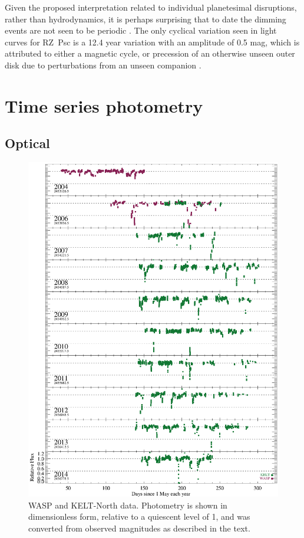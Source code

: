 \documentclass[]{rsos}
\begin{document}
Given the proposed interpretation related to individual planetesimal disruptions, rather
than hydrodynamics, it is perhaps surprising that to date the dimming events are not seen
to be periodic \cite{1999AstL...25..243R,2013A&A...553L...1D}. The only cyclical
variation seen in light curves for RZ~Psc is a 12.4 year variation with an amplitude of
0.5 mag, which is attributed to either a magnetic cycle, or precession of an otherwise
unseen outer disk due to perturbations from an unseen companion
\cite{2013A&A...553L...1D}.

\section{Time series photometry}\label{s:data}

\subsection{Optical}\label{ss:opt}

\begin{figure}
  \begin{center}
    \hspace{-0.5cm} \includegraphics[width=\textwidth]{figs/yearly-2004.eps}
    \caption{WASP and KELT-North data. Photometry is shown in dimensionless form,
      relative to a quiescent level of 1, and was converted from observed magnitudes as
      described in the text.}\label{fig:waspkelt}
  \end{center}
\end{figure}
\end{document}
